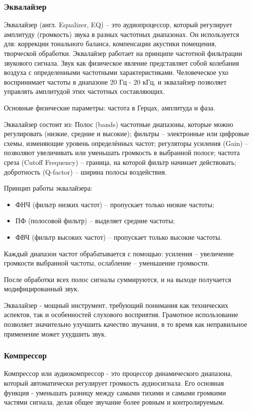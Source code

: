 \subsubsection{Эквалайзер}

Эквалайзер (англ. Equalizer, EQ) – это аудиопроцессор, который регулирует амплитуду (громкость) звука в разных частотных диапазонах. Он используется для: коррекции тонального баланса, компенсации акустики помещения, творческой обработки. Эквалайзер работает на принципе частотной фильтрации звукового сигнала. Звук как физическое явление представляет собой колебания воздуха с определенными частотными характеристиками. Человеческое ухо воспринимает частоты в диапазоне 20 Гц - 20 кГц, и эквалайзер позволяет управлять амплитудой этих частотных составляющих.

Основные физические параметры: частота в Герцах, амплитуда и фаза.

Эквалайзер состоит из: Полос (bands) частотные диапазоны, которые можно регулировать (низкие, средние и высокие); фильтры – электронные или цифровые схемы, изменяющие уровень определённых частот; регуляторы усиления (Gain) – позволяют увеличивать или уменьшать громкость в выбранной полосе; частота среза (Cutoff Frequency) – граница, на которой фильтр начинает действовать; добротность (Q-factor) – ширина полосы воздействия.

Принцип работы эквалайзера:
\begin{itemize}
	\item ФНЧ (фильтр низких частот) – пропускает только низкие частоты;
	\item ПФ (полосовой фильтр) – выделяет средние частоты;
	\item ФВЧ (фильтр высоких частот) – пропускает только высокие частоты.
\end{itemize}

Каждый диапазон частот обрабатывается с помощью: усиления – увеличение громкости выбранной частоты, ослабление – уменьшение громкости.

После обработки всех полос сигналы суммируются, и на выходе получается модифицированный звук.

Эквалайзер - мощный инструмент, требующий понимания как технических аспектов, так и особенностей слухового восприятия. Грамотное использование позволяет значительно улучшить качество звучания, в то время как неправильное применение может ухудшить звук.

\subsubsection{Компрессор}
Компрессор или аудиокомпрессор - это процессор динамического диапазона, который автоматически регулирует громкость аудиосигнала. Его основная функция - уменьшать разницу между самыми тихими и самыми громкими частями сигнала, делая общее звучание более ровным и контролируемым.

